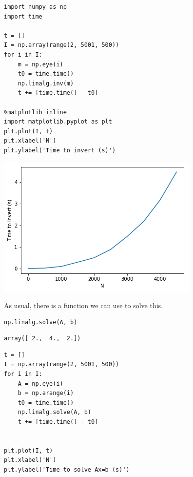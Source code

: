 \documentclass[11pt]{article}
\begin{document}
\begin{verbatim}
import numpy as np
import time

t = []
I = np.array(range(2, 5001, 500))
for i in I:
    m = np.eye(i)
    t0 = time.time()
    np.linalg.inv(m)
    t += [time.time() - t0]

%matplotlib inline
import matplotlib.pyplot as plt
plt.plot(I, t)
plt.xlabel('N')
plt.ylabel('Time to invert (s)')
\end{verbatim}

\begin{center}
\includegraphics[width=.9\linewidth]{obipy-resources/d9c35b77cdd76b0df36e56b4fdad927c-65837o9f.png}
\end{center}

As usual, there is a function we can use to solve this.

\begin{verbatim}
np.linalg.solve(A, b)
\end{verbatim}

\begin{verbatim}
array([ 2.,  4.,  2.])
\end{verbatim}

\begin{verbatim}
t = []
I = np.array(range(2, 5001, 500))
for i in I:
    A = np.eye(i)
    b = np.arange(i)
    t0 = time.time()
    np.linalg.solve(A, b)
    t += [time.time() - t0]


plt.plot(I, t)
plt.xlabel('N')
plt.ylabel('Time to solve Ax=b (s)')
\end{verbatim}
\end{document}
